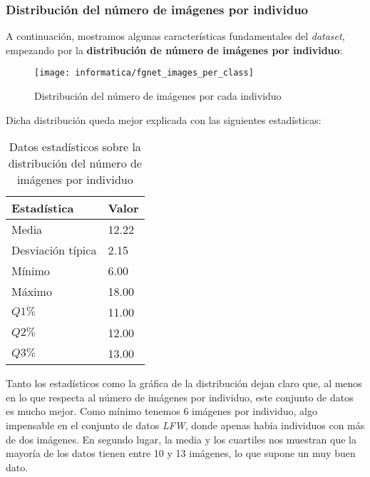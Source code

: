 \subsubsection{Distribución del número de imágenes por individuo}

A continuación, mostramos algunas características fundamentales del \textit{dataset}, empezando por la \textbf{distribución de número de imágenes por individuo}:

\begin{figure}[H]
    \centering
    \texttt{[image: informatica/fgnet\_images\_per\_class]}
    \caption{Distribución del número de imágenes por cada individuo}
    \label{img:fgnet_images_per_class}
\end{figure}

Dicha distribución queda mejor explicada con las siguientes estadísticas:

\begin{table}[H]
\centering
\begin{tabular}{|l|l|}
    \hline
    \textbf{Estadística} & \textbf{Valor} \\
    \hline

    Media             & 12.22 \\
    Desviación típica & 2.15  \\
    Mínimo            & 6.00 \\
    Máximo            & 18.00 \\
    $Q1 \%$           & 11.00 \\
    $Q2 \%$           & 12.00 \\
    $Q3 \%$           & 13.00 \\

    \hline

\end{tabular}
\caption{Datos estadísticos sobre la distribución del número de imágenes por individuo}
\label{table:fgnet_images_per_class}
\end{table}

Tanto los estadísticos como la gráfica de la distribución dejan claro que, al menos en lo que respecta al número de imágenes por individuo, este conjunto de datos es mucho mejor. Como mínimo tenemos 6 imágenes por individuo, algo impensable en el conjunto de datos \textit{LFW}, donde apenas había individuos con más de dos imágenes. En segundo lugar, la media y los cuartiles nos muestran que la mayoría de los datos tienen entre 10 y 13 imágenes, lo que supone un muy buen dato.


